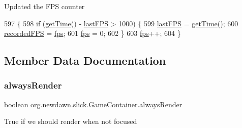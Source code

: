 Updated the F\+PS counter 
\begin{DoxyCode}
597                                \{
598         \textcolor{keywordflow}{if} (\mbox{\hyperlink{classorg_1_1newdawn_1_1slick_1_1_game_container_a1650b161216693ec0b4c0d9d00496c05}{getTime}}() - \mbox{\hyperlink{classorg_1_1newdawn_1_1slick_1_1_game_container_a04cdf0b74c76425818a11bb0404d5576}{lastFPS}} > 1000) \{
599             \mbox{\hyperlink{classorg_1_1newdawn_1_1slick_1_1_game_container_a04cdf0b74c76425818a11bb0404d5576}{lastFPS}} = \mbox{\hyperlink{classorg_1_1newdawn_1_1slick_1_1_game_container_a1650b161216693ec0b4c0d9d00496c05}{getTime}}();
600             \mbox{\hyperlink{classorg_1_1newdawn_1_1slick_1_1_game_container_a1b65e4d07aaae2b711971a95e55667be}{recordedFPS}} = \mbox{\hyperlink{classorg_1_1newdawn_1_1slick_1_1_game_container_aee0fed3a01c1063c678bfb7b1d950aa1}{fps}};
601             \mbox{\hyperlink{classorg_1_1newdawn_1_1slick_1_1_game_container_aee0fed3a01c1063c678bfb7b1d950aa1}{fps}} = 0;
602         \}
603         \mbox{\hyperlink{classorg_1_1newdawn_1_1slick_1_1_game_container_aee0fed3a01c1063c678bfb7b1d950aa1}{fps}}++;
604     \}
\end{DoxyCode}


\subsection{Member Data Documentation}
\mbox{\label{classorg_1_1newdawn_1_1slick_1_1_game_container_afc21372962046ca458a65fbd22fe4905}} 
\subsubsection{\texorpdfstring{always\+Render}{alwaysRender}}
{\footnotesize\ttfamily boolean org.\+newdawn.\+slick.\+Game\+Container.\+always\+Render\hspace{0.3cm}{\ttfamily [protected]}}

True if we should render when not focused \mbox{\label{classorg_1_1newdawn_1_1slick_1_1_game_container_acccadaba3a6d02a39d05b73fbe8d6135}} 
